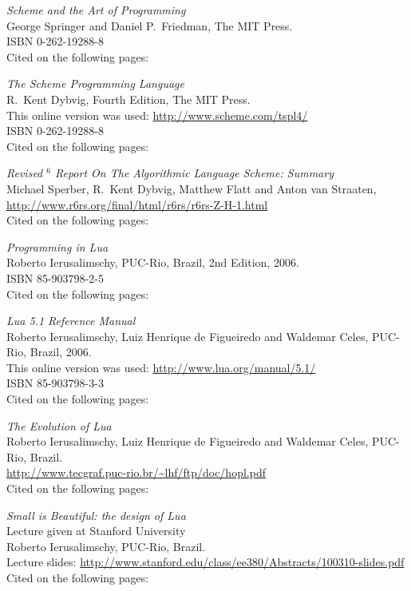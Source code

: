\begin{thebibliography}{9}

  \emph{Scheme and the Art of Programming} \\
  George Springer and Daniel P.\ Friedman,
  The MIT Press. \\
  ISBN 0-262-19288-8 \\
  Cited on the following pages: 

  \emph{The Scheme Programming Language} \\
  R.\ Kent Dybvig,
  Fourth Edition,
  The MIT Press. \\
  This online version was used: \url{http://www.scheme.com/tspl4/} \\
  ISBN 0-262-19288-8 \\
  Cited on the following pages: 

  \emph{Revised $^6$ Report On The Algorithmic Language Scheme: Summary} \\
  Michael Sperber, R.\ Kent Dybvig, Matthew Flatt and Anton van Straaten, \\
  \url{http://www.r6rs.org/final/html/r6rs/r6rs-Z-H-1.html} \\
  Cited on the following pages: 

  \emph{Programming in Lua} \\
  Roberto Ierusalimschy,
  PUC-Rio, Brazil,
  2nd Edition,
  2006. \\
  ISBN 85-903798-2-5 \\
  Cited on the following pages: 
  
  \emph{Lua 5.1 Reference Manual} \\
  Roberto Ierusalimschy, Luiz Henrique de Figueiredo and Waldemar Celes,
  PUC-Rio, Brazil,
  2006. \\
  This online version was used: \url{http://www.lua.org/manual/5.1/} \\
  ISBN 85-903798-3-3 \\
  Cited on the following pages: 
  
  \emph{The Evolution of Lua} \\
  Roberto Ierusalimschy, Luiz Henrique de Figueiredo and Waldemar Celes,
  PUC-Rio, Brazil. \\
  \url{http://www.tecgraf.puc-rio.br/~lhf/ftp/doc/hopl.pdf} \\
  Cited on the following pages: 
  
  \emph{Small is Beautiful: the design of Lua} \\
  Lecture given at Stanford University \\
  Roberto Ierusalimschy,
  PUC-Rio, Brazil. \\
  Lecture slides:
  \url{http://www.stanford.edu/class/ee380/Abstracts/100310-slides.pdf}
  Cited on the following pages: 


\end{thebibliography}
